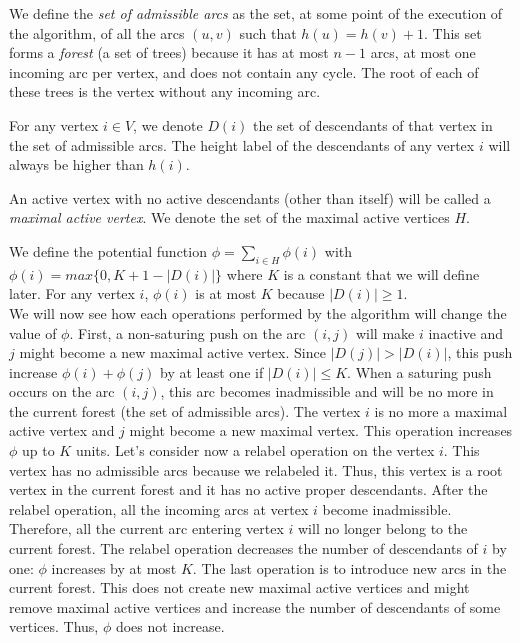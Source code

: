 We define the \textit{set of admissible arcs} as the set, at some point of the execution of the algorithm, of all the arcs $(u, v)$ such that $h(u) = h(v) + 1$. This set forms a \textit{forest} (a set of trees) because it has at most $n - 1$ arcs,  at most one incoming arc per vertex, and does not contain any cycle. The root of each of these trees is the vertex without any incoming arc. 

For any vertex $i \in V$, we denote $D(i)$ the set of descendants of that vertex in the set of admissible arcs. The height label of the descendants of any vertex $i$ will always be higher than $h(i)$. 

An active vertex with no active descendants (other than itself) will be called a \textit{maximal active vertex}. We denote the set of the maximal active vertices $H$.

We define the potential function $\phi = \sum_{i \in H} \phi(i)$ with $\phi(i) = max\{0, K + 1 - |D(i)|\}$ where $K$ is a constant that we will define later. For any vertex $i$, $\phi(i)$ is at most $K$ because $|D(i)| \ge 1$.\\

We will now see how each operations performed by the algorithm will change the value of $\phi$. First, a non-saturing push on the arc $(i, j)$ will make $i$ inactive and $j$ might become a new maximal active vertex. Since $|D(j)| > |D(i)|$, this push increase $\phi(i) + \phi(j)$ by at least one if $|D(i)| \le K$. When a saturing push occurs on the arc $(i, j)$, this arc becomes inadmissible and will be no more in the current forest (the set of admissible arcs). The vertex $i$ is no more a maximal active vertex and $j$ might become a new maximal vertex. This operation increases $\phi$ up to $K$ units. Let's consider now a relabel operation on the vertex $i$. This vertex has no admissible arcs because we relabeled it. Thus, this vertex is a root vertex in the current forest and it has no active proper descendants. After the relabel operation, all the incoming arcs at vertex $i$ become inadmissible. Therefore, all the current arc entering vertex $i$ will no longer belong to the current forest. The relabel operation decreases the number of descendants of $i$ by one: $\phi$ increases by at most $K$. The last operation is to introduce new arcs in the current forest. This does not create new maximal active vertices and might remove maximal active vertices and increase the number of descendants of some vertices. Thus, $\phi$ does not increase.\\


